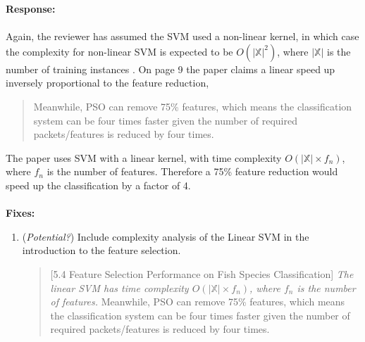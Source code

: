 \documentclass[runningheads]{llncs}
\begin{document}
\noindent\textbf{Response:}
\\\\
Again, the reviewer has assumed the SVM used a non-linear kernel, in which case the complexity for non-linear SVM is expected to be $O(|\mathbb{X}|^2)$, where $|\mathbb{X}|$ is the number of training instances \cite{chang2011libsvm}. On page 9 the paper claims a linear speed up inversely proportional to the feature reduction, 

\begin{quote}
  Meanwhile, PSO can remove 75\% features, which means the classification system can be four times faster given the number of required packets/features is reduced by four times. 
\end{quote}

The paper uses SVM with a linear kernel, with time complexity $O(|\mathbb{X}| \times f_n)$, where $f_n$ is the number of features. Therefore a 75\% feature reduction would speed up the classification by a factor of 4. 
\\\\
\noindent\textbf{Fixes:}

\begin{enumerate}
  \item (\emph{Potential?}) Include complexity analysis of the Linear SVM in the introduction to the feature selection. 
  \begin{quote}
    [5.4 Feature Selection Performance on Fish Species Classification]
    \emph{The linear SVM has time complexity $O(|\mathbb{X}| \times f_n)$, where $f_n$ is the number of features.}
    Meanwhile, PSO can remove 75\% features, which means the classification system can be four times faster given the number of required packets/features is reduced by four times. 
  \end{quote}
\end{enumerate}


% 

\end{document}
